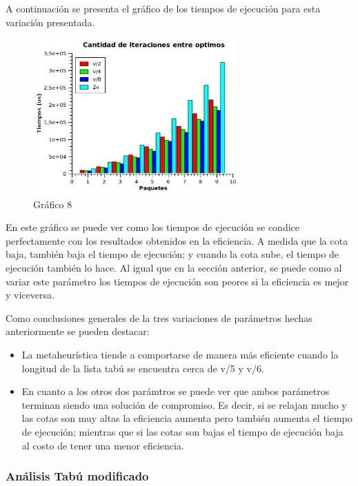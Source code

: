 \documentclass[a4paper,10pt]{article}
\begin{document}
A continuaci\'on se presenta el gr\'afico de los tiempos de ejecuci\'on para esta variaci\'on presentada.

\begin{figure}[H]
\centering
\includegraphics[width=0.7\textwidth]{graficos/combo5Tiempos.png} 
\caption{Gráfico 8}
\end{figure}

En este gr\'afico se puede ver como los tiempos de ejecuci\'on se condice perfectamente con los resultados obtenidos en la eficiencia. A medida que la cota baja, tambi\'en baja el tiempo de ejecuci\'on; y cuando la cota sube, el tiempo de ejecuci\'on tambi\'en lo hace. Al igual que en la secci\'on anterior, se puede como al variar este par\'ametro los tiempos de ejecuci\'on son peores si la eficiencia es mejor y viceversa.


\bigskip

Como conclusiones generales de la tres variaciones de par\'ametros hechas anteriormente se pueden destacar:

\begin{itemize}
\item La metaheur\'istica tiende a comportarse de manera m\'as eficiente cuando la longitud de la lista tab\'u se encuentra cerca de v/5 y v/6.
\item En cuanto a los otros dos par\'amtros se puede ver que ambos par\'ametros terminan siendo una soluci\'on de compromiso. Es decir, si se relajan mucho y las cotas son muy altas la eficiencia aumenta pero tambi\'en aumenta el tiempo de ejecuci\'on; mientras que si las cotas son bajas el tiempo de ejecuci\'on baja al costo de tener una menor eficiencia. 
\end{itemize}

\subsubsection*{An\'alisis Tab\'u modificado}
\end{document}
